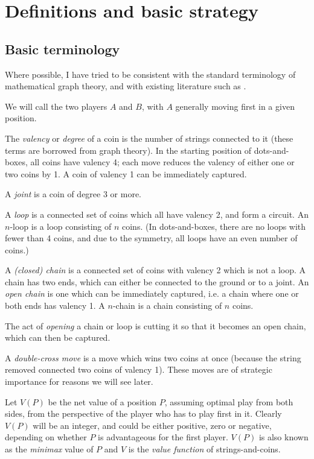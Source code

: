 \documentclass[a4paper,twocolumn]{article}
\begin{document}
\section{Definitions and basic strategy}

\subsection{Basic terminology}

Where possible, I have tried to be consistent with the standard
terminology of mathematical graph theory, and with existing literature
such as \cite{berl}.

We will call the two players $A$ and $B$, with $A$ generally moving
first in a given position.

The \emph{valency} or \emph{degree} of a coin is the number of strings
connected to it (these terms are borrowed from graph theory). In the
starting position of dots-and-boxes, all coins have valency 4; each
move reduces the valency of either one or two coins by 1. A coin of
valency 1 can be immediately captured.

A \emph{joint} is a coin of degree 3 or more.

A \emph{loop} is a connected set of coins which all have valency 2, and
form a circuit. An $n$-loop is a loop consisting of $n$ coins. (In
dots-and-boxes, there are no loops with fewer than 4 coins, and due to
the symmetry, all loops have an even number of coins.)

A \emph{(closed) chain} is a connected set of coins with valency 2
which is not a loop. A chain has two ends, which can either be
connected to the ground or to a joint. An \emph{open chain} is one
which can be immediately captured, i.e. a chain where one or both ends
has valency 1. A $n$-chain is a chain consisting of $n$ coins.

The act of \emph{opening} a chain or loop is cutting it so that it
becomes an open chain, which can then be captured.

A \emph{double-cross move} is a move which wins two coins at once
(because the string removed connected two coins of valency 1). These
moves are of strategic importance for reasons we will see later.

Let $V(P)$ be the net value of a position $P$, assuming optimal play
from both sides, from the perspective of the player who has to play
first in it. Clearly $V(P)$ will be an integer, and could be either
positive, zero or negative, depending on whether $P$ is advantageous
for the first player. $V(P)$ is also known as the \emph{minimax} value
of $P$ and $V$ is the \emph{value function} of strings-and-coins.
\end{document}
